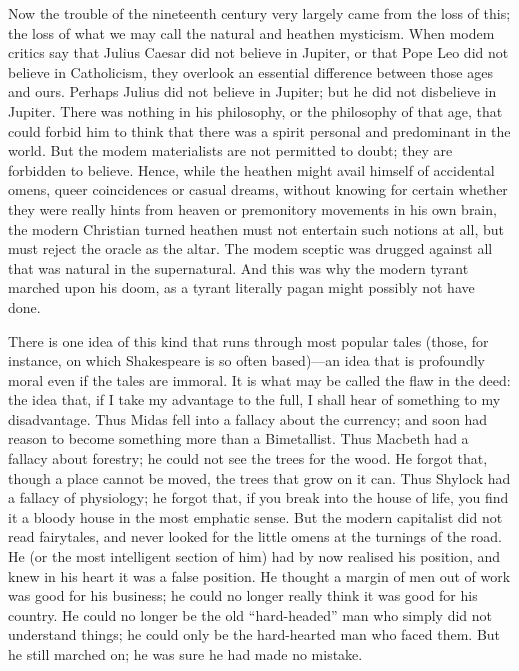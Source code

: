 \documentclass{book}
\begin{document}
Now the trouble of the nineteenth century very largely came from the loss of this; the loss of what we may call the natural and heathen mysticism. When modem critics say that Julius Caesar did not believe in Jupiter, or that Pope Leo did not believe in Catholicism, they overlook an essential difference between those ages and ours. Perhaps Julius did not believe in Jupiter; but he did not disbelieve in Jupiter. There was nothing in his philosophy, or the philosophy of that age, that could forbid him to think that there was a spirit personal and predominant in the world. But the modem materialists are not permitted to doubt; they are forbidden to believe. Hence, while the heathen might avail himself of accidental omens, queer coincidences or casual dreams, without knowing for certain whether they were really hints from heaven or premonitory movements in his own brain, the modern Christian turned heathen must not entertain such notions at all, but must reject the oracle as the altar. The modem sceptic was drugged against all that was natural in the supernatural. And this was why the modern tyrant marched upon his doom, as a tyrant literally pagan might possibly not have done.

There is one idea of this kind that runs through most popular tales (those, for instance, on which Shakespeare is so often based)—an idea that is profoundly moral even if the tales are immoral. It is what may be called the flaw in the deed: the idea that, if I take my advantage to the full, I shall hear of something to my disadvantage. Thus Midas fell into a fallacy about the currency; and soon had reason to become something more than a Bimetallist. Thus Macbeth had a fallacy about forestry; he could not see the trees for the wood. He forgot that, though a place cannot be moved, the trees that grow on it can. Thus Shylock had a fallacy of physiology; he forgot that, if you break into the house of life, you find it a bloody house in the most emphatic sense. But the modern capitalist did not read fairytales, and never looked for the little omens at the turnings of the road. He (or the most intelligent section of him) had by now realised his position, and knew in his heart it was a false position. He thought a margin of men out of work was good for his business; he could no longer really think it was good for his country. He could no longer be the old “hard-headed” man who simply did not understand things; he could only be the hard-hearted man who faced them. But he still marched on; he was sure he had made no mistake.
\end{document}
